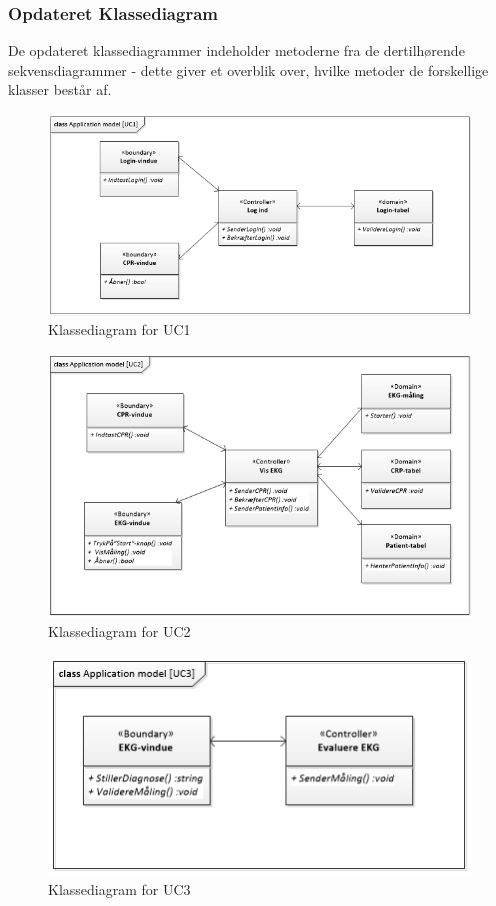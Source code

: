 \subsubsection{Opdateret Klassediagram}
De opdateret klassediagrammer indeholder metoderne fra de dertilhørende  sekvensdiagrammer - dette giver et overblik over, hvilke metoder de forskellige klasser består af.

\begin{figure}[H]
	\centering
	\includegraphics[width=1\textwidth]{Figurer/Snip20150429_20}
	\caption{Klassediagram for UC1}
\end{figure}  

\begin{figure}[H]
	\centering
	\includegraphics[width=1\textwidth]{Figurer/Snip20150429_22}
	\caption{Klassediagram for UC2}
\end{figure}

\begin{figure}[H]
	\centering
	\includegraphics[width=1\textwidth]{Figurer/Snip20150429_23}
	\caption{Klassediagram for UC3}
\end{figure}

